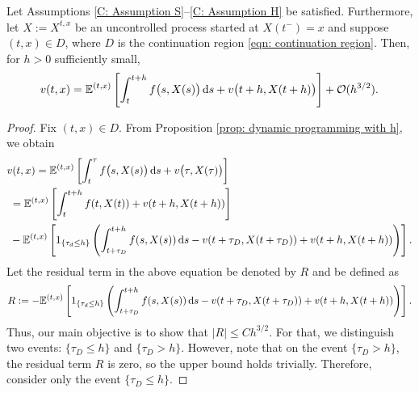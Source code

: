 \begin{proposition}
\label{prop: small-h approximation}
    Let Assumptions \ref{C: Assumption S}--\ref{C: Assumption H} be satisfied. Furthermore, let $X:=X^{t,x}$ be an uncontrolled process started at $X(t^-)=x$ and suppose $(t,x) \in D$, where $D$ is the continuation region \eqref{eqn: continuation region}. Then, for $h>0$ sufficiently small, 
    \begin{equation*}
        v(t,x) = \mathbb{E}^{(t,x)} \left[ \int_t^{t+h} f\big(s,X(s)\big) \,\mathrm{d} s + v\big(t+h,X(t+h)\big) \right] + \mathcal{O}(h^{3/2}).
    \end{equation*}
\end{proposition}
\begin{proof}
    Fix $(t,x)\in D$. From Proposition \ref{prop: dynamic programming with h}, we obtain
    \begin{align*}
        & v(t,x) = \mathbb{E}^{(t,x)} \left[ \int_t^{\tau} f\big(s,X(s)\big)\,\mathrm{d} s + v\big(\tau,X(\tau)\big) \right] \\
        &\;= \mathbb{E}^{(t,x)} \left[\int_t^{t+h} f(t,X(t)) + v(t+h, X(t+h)) \right] \\
        & \; -\mathbb{E}^{(t,x)} \left[ 1_{\left\{\tau_d \leq h\right\}} \left(\int_{t+\tau_D}^{t+h}f(s,X(s)) \,\mathrm{d} s - v(t+\tau_D,X(t+\tau_D)) + v(t+h,X(t+h)) \right)\right].
    \end{align*} 
    Let the residual term in the above equation be denoted by $R$ and be defined as
    \begin{equation}
        R:=-\mathbb{E}^{(t,x)} \left[ 1_{\left\{\tau_d \leq h\right\}} \left(\int_{t+\tau_D}^{t+h}f(s,X(s)) \,\mathrm{d} s - v(t+\tau_D,X(t+\tau_D)) + v(t+h,X(t+h)) \right)\right].
        \label{C: residual term}
    \end{equation}
    Thus, our main objective is to show that $|R| \leq Ch^{3/2}$. For that, we distinguish two events: $\{\tau_D \leq h\}$ and $\{\tau_D > h\}$. However, note that on the event $\{\tau_D > h\}$, the residual term $R$ is zero, so the upper bound holds trivially. Therefore, consider only the event $\{\tau_D \leq h\}$. 


\end{proof}
